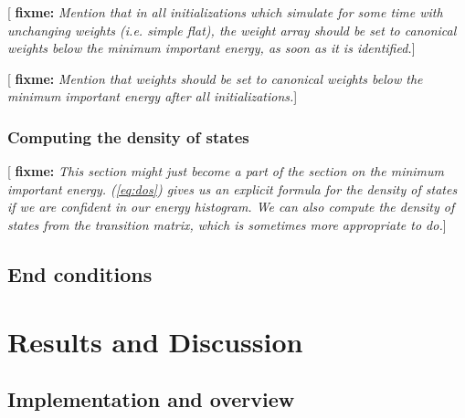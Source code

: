 \documentclass[11pt]{article}
\newcommand{\red}[1]{{\bf \color{red} #1}}
\newcommand{\fixme}[1]{[\red{fixme:} \emph{#1}]}
\begin{document}
\fixme{Mention that in all initializations which simulate for some
  time with unchanging weights (i.e. simple flat), the weight array
  should be set to canonical weights below the minimum important
  energy, as soon as it is identified.}

\fixme{Mention that weights should be set to canonical weights below
  the minimum important energy after all initializations.}

\subsubsection{Computing the density of states}
\label{sec:dos}

\fixme{This section might just become a part of the section on the
  minimum important energy. (\ref{eq:dos}) gives us an explicit
  formula for the density of states if we are confident in our energy
  histogram. We can also compute the density of states from the
  transition matrix, which is sometimes more appropriate to do.}

\subsection{End conditions}
\label{sec:end_conditions}




\section{Results and Discussion}
\label{sec:results}

\subsection{Implementation and overview}
\label{sec:implementation}
\end{document}
